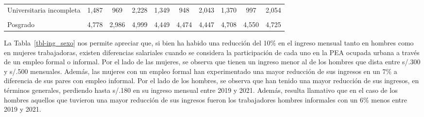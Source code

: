 \documentclass[
  letterpaper,
  12pt,
  oneside,
  spanish,
  doublespacing,
  headsepline,
  parskip]{MastersDoctoralThesis}
\begin{document}
\begin{table}[H]
\begin{tabular}{>{\raggedright\arraybackslash}p{10em}ccccccccc}
Universitaria incompleta & 1,487 & 969 & 2,228 & 1,349 & 948 & 2,043 & 1,370 & 997 & 2,054\\
\cellcolor{gray!6}{Universitaria completa} & \cellcolor{gray!6}{2,768} & \cellcolor{gray!6}{1,531} & \cellcolor{gray!6}{3,287} & \cellcolor{gray!6}{2,592} & \cellcolor{gray!6}{1,436} & \cellcolor{gray!6}{3,085} & \cellcolor{gray!6}{2,729} & \cellcolor{gray!6}{1,510} & \cellcolor{gray!6}{3,350}\\
Posgrado & 4,778 & 2,986 & 4,999 & 4,449 & 4,474 & 4,447 & 4,708 & 4,550 & 4,725\\
\bottomrule
\end{tabular}
\endgroup{}
\end{table}

La Tabla~\ref{tbl-ing_sexo} nos permite apreciar que, si bien ha habido
una reducción del 10\% en el ingreso mensual tanto en hombres como en
mujeres trabajadoras, existen diferencias salariales cuando se considera
la participación de cada uno en la PEA ocupada urbana a través de un
empleo formal o informal. Por el lado de las mujeres, se observa que
tienen un ingreso menor al de los hombres que dista entre s/.300 y
s/.500 mensuales. Además, las mujeres con un empleo formal han
experimentado una mayor reducción de sus ingresos en un 7\% a diferencia
de sus pares con empleo informal. Por el lado de los hombres, se observa
que han tenido una mayor reducción de sus ingresos, en términos
generales, perdiendo hasta s/.180 en su ingreso mensual entre 2019 y
2021. Además, resulta llamativo que en el caso de los hombres aquellos
que tuvieron una mayor reducción de sus ingresos fueron los trabajadores
hombres informales con un 6\% menos entre 2019 y 2021.
\end{document}
